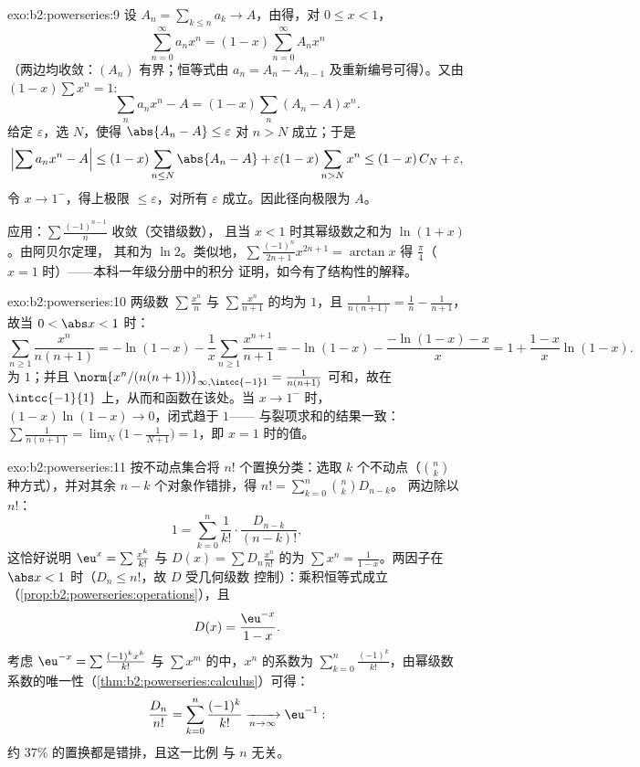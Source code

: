 \begin{solution}{exo:b2:powerseries:9}
设 $A_n = \sum_{k \leq n} a_k \to A$，由得，对
$0 \leq x < 1$，
\[
\sum_{n=0}^{\infty} a_n x^n = (1 - x)\sum_{n=0}^{\infty} A_n x^n
\]
（两边均收敛：$(A_n)$ 有界；恒等式由
$a_n = A_n - A_{n-1}$ 及重新编号可得）。又由 $(1 -
x)\sum x^n = 1$:
\[
\sum_n a_nx^n - A = (1-x)\sum_{n} (A_n - A)x^n .
\]
给定 $\varepsilon$，选 $N$，使得 $\abs{A_n - A} \leq
\varepsilon$ 对 $n > N$ 成立；于是
\[
\Bigl|\sum a_nx^n - A\Bigr|
\leq (1-x)\sum_{n \leq N}\abs{A_n - A} + \varepsilon(1 -
x)\sum_{n > N}x^n
\leq (1-x)\,C_N + \varepsilon ,
\]
令 $x \to 1^-$，得上极限 $\leq \varepsilon$，对所有
$\varepsilon$ 成立。因此径向极限为 $A$。

应用：$\sum \frac{(-1)^{n-1}}{n}$ 收敛（交错级数），
且当 $x < 1$ 时其幂级数之和为 $\ln(1 + x)$。由阿贝尔定理，
其和为 $\ln 2$。类似地，$\sum\frac{(-1)^n}{2n+1}x^{2n+1} =
\arctan x$ 得 $\frac\pi4$（$x = 1$ 时）——本科一年级分册中的积分
证明，如今有了结构性的解释。
\end{solution}

\begin{solution}{exo:b2:powerseries:10}
两级数 $\sum\frac{x^n}{n}$ 与 $\sum\frac{x^n}{n+1}$ 的均为
$1$，且 $\frac{1}{n(n+1)} = \frac1n - \frac1{n+1}$，故当 $0
< \abs x < 1$ 时：
\[
\sum_{n\geq1}\frac{x^n}{n(n+1)}
= -\ln(1-x) - \frac1x\sum_{n\geq1}\frac{x^{n+1}}{n+1}
= -\ln(1-x) - \frac{-\ln(1-x) - x}{x}
= 1 + \frac{1-x}{x}\ln(1-x) .
\]
为 $1$；并且 $\norm{x^n/(n(n+1))}_{\infty,\intcc{-1}1} =
\frac{1}{n(n+1)}$ 可和，故在
$\intcc{-1}{1}$ 上，从而和函数在该处。当 $x \to
1^-$ 时，$(1-x)\ln(1-x) \to 0$，闭式趋于 $1$——
与裂项求和的结果一致：$\sum\frac{1}{n(n+1)} =
\lim_N\bigl(1 - \frac{1}{N+1}\bigr) = 1$，即 $x = 1$ 时的值。
\end{solution}

\begin{solution}{exo:b2:powerseries:11}
按不动点集合将 $n!$ 个置换分类：选取
$k$ 个不动点（$\binom nk$ 种方式），并对其余
$n - k$ 个对象作错排，得 $n! = \sum_{k=0}^n\binom nk D_{n-k}$。
两边除以 $n!$：
\[
1 = \sum_{k=0}^{n}\frac{1}{k!}\cdot\frac{D_{n-k}}{(n-k)!} ,
\]
这恰好说明 $\eu^x =
\sum\frac{x^k}{k!}$ 与 $D(x) = \sum D_n\frac{x^n}{n!}$ 的为
$\sum x^n = \frac{1}{1-x}$。两因子在
$\abs x < 1$ 时（$D_n \leq n!$，故 $D$ 受几何级数
控制）：乘积恒等式成立
（\cref{prop:b2:powerseries:operations}），且
\[
D(x) = \frac{\eu^{-x}}{1-x} .
\]
考虑 $\eu^{-x} = \sum\frac{(-1)^kx^k}{k!}$ 与
$\sum x^m$ 的中，$x^n$ 的系数为
$\sum_{k=0}^{n}\frac{(-1)^k}{k!}$，由幂级数
系数的唯一性（\cref{thm:b2:powerseries:calculus}）可得：
\[
\frac{D_n}{n!} = \sum_{k=0}^{n}\frac{(-1)^k}{k!}
\xrightarrow[n\to\infty]{} \eu^{-1} :
\]
约 $37\%$ 的置换都是错排，且这一比例
与 $n$ 无关。
\end{solution}

